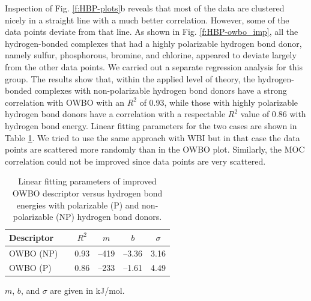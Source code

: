 \documentclass[11pt]{report}
\begin{document}
Inspection of Fig. \ref{f:HBP-plots}b reveals that most of the data are
clustered nicely in a straight line with a much better correlation. However, some of the data points deviate from that line. As shown in Fig.
\ref{f:HBP-owbo_imp}, all the hydrogen-bonded complexes that had a highly polarizable hydrogen bond donor, namely sulfur, phosphorous, bromine, and chlorine, appeared to deviate largely from the other data points. We carried out a separate regression analysis for this group. The results show that, within the applied level of theory, the hydrogen-bonded complexes with non-polarizable hydrogen bond donors have a strong correlation with OWBO with an $R^2$ of 0.93, while those with highly polarizable hydrogen bond donors have a correlation with a respectable $R^2$ value of 0.86 with hydrogen bond energy. Linear fitting parameters for the two cases are shown in Table
\ref{t:HBP-OWBO2}. We tried to use the same approach with WBI but in that case the data points are scattered more randomly than in the OWBO plot. Similarly, the MOC correlation could not be improved since data points are very scattered.
\begin{table}
 \caption[Linear fitting parameters of improved OWBO descriptor]{Linear fitting parameters of improved OWBO descriptor versus hydrogen bond energies
 with polarizable (P) and non-polarizable (NP) hydrogen bond donors.}
 \label{t:HBP-OWBO2}
 \centering
 \begin{tabular*}{\linewidth}{@{\extracolsep{\fill}}lccccc}
\toprule
 Descriptor && $R^{2}$ & $m$ & $b$ & $\sigma$ \\
\midrule
 OWBO (NP)&& 0.93	& --419	& --3.36  & 3.16 \\
 OWBO (P)&& 0.86	& --233 & --1.61  & 4.49 \\
\bottomrule
 \end{tabular*}
 \vspace{-0.45cm}
  \begin{flushleft}
  $m$, $b$, and $\sigma$ are given in kJ/mol.
  \end{flushleft}
\end{table}
\end{document}

